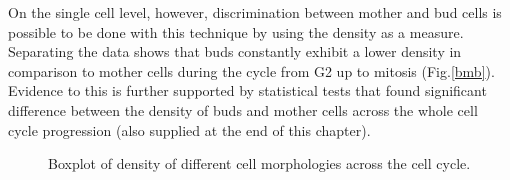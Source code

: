 On the single cell level, however, discrimination between mother and bud cells is possible to be done with this technique by using the density as a measure. 
Separating the data shows that buds constantly exhibit a lower density in comparison to mother cells during the cycle from G2 up to mitosis (Fig.\ref{bmb}). 
Evidence to this is further supported by statistical tests that found significant difference between the density of buds and mother cells across the whole cell cycle progression (also supplied at the end of this chapter). 

\begin{figure}[h!]
\centering
{}\hfil
{}
\caption{Boxplot of density of different cell morphologies across the cell cycle.}
\label{fig:bplot}
\end{figure}



\renewcommand{\refname}{\spacedlowsmallcaps{References}} %
%


